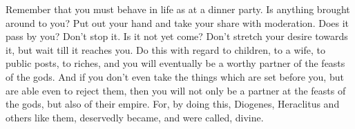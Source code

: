 Remember that you must behave in life as at a dinner party. Is anything brought
around to you? Put  out your hand and take your share  with moderation. Does it
pass by  you? Don't  stop it.  Is it not  yet come?  Don't stretch  your desire
towards it, but wait till it reaches you. Do this with regard to children, to a
wife, to public posts,  to riches, and you will eventually  be a worthy partner
of the feasts of the gods. And if  you don't even take the things which are set
before you,  but are  able even to  reject them,  then you will  not only  be a
partner at  the feasts of  the gods,  but also of  their empire. For,  by doing
this, Diogenes,  Heraclitus and others  like them, deservedly became,  and were
called, divine.
